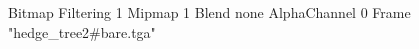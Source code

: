 {Bitmap
	{Filtering 1}
	{Mipmap 1}
	{Blend none}
	{AlphaChannel 0}
	{Frame "hedge_tree2#bare.tga"}
}
